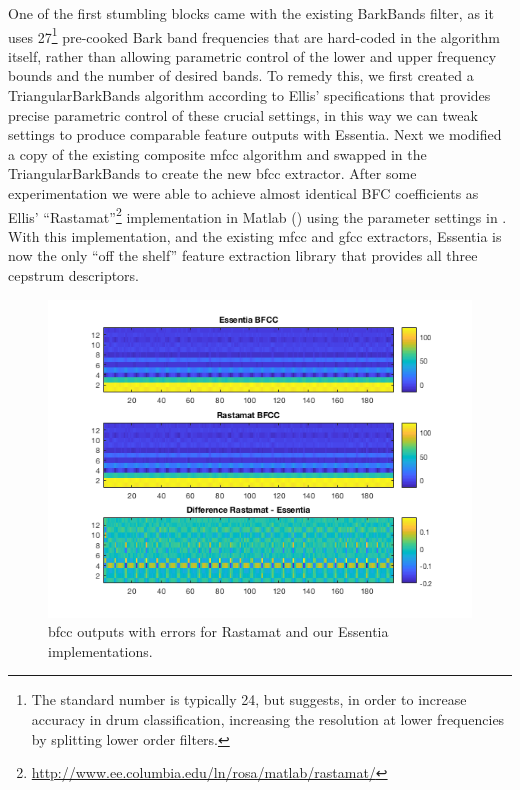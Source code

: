 {{{{One of the first stumbling blocks came with the existing BarkBands filter, as it uses 27\footnote{The standard number is typically 24, but \cite{Herrera2003} suggests, in order to increase accuracy in drum classification, increasing the resolution at lower frequencies by splitting lower order filters.} pre-cooked Bark band frequencies that are hard-coded in the algorithm itself, rather than allowing parametric control of the lower and upper frequency bounds and the number of desired bands. To remedy this, we first created a TriangularBarkBands algorithm according to Ellis' specifications that provides precise parametric control of these crucial settings, in this way we can tweak settings to produce comparable feature outputs with Essentia. Next we modified a copy of the existing composite \acrshort{mfcc} algorithm and swapped in the TriangularBarkBands to create the new \acrshort{bfcc} extractor. After some experimentation we were able to achieve almost identical BFC coefficients as Ellis' ``Rastamat''\footnote{\url{http://www.ee.columbia.edu/ln/rosa/matlab/rastamat/}} implementation in Matlab () using the parameter settings in . With this implementation, and the existing \acrshort{mfcc} and \acrshort{gfcc} extractors, Essentia is now the only ``off the shelf'' feature extraction library that provides all three cepstrum descriptors.

\begin{figure}
	\begin{center}
		\includegraphics[width=1.0\textwidth]{ch05_pyconcat/figures/matlab_bark.png}
	\end{center}
	\caption[BFCC outputs with errors for Rastamat and our Essentia implementations]{\acrshort{bfcc} outputs with errors for Rastamat and our Essentia implementations.}
	\label{fig:matlab_bark}
\end{figure}

}}}}
